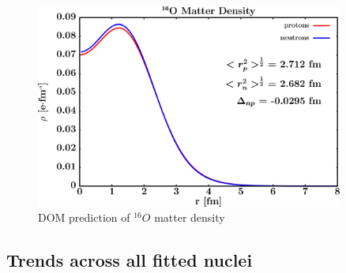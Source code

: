 \begin{figure}
\begin{center}
\includegraphics[width = 0.9\textwidth]{figures/o16_matterDensity.png}
\caption{DOM prediction of $^{16}O$ matter density}
\label{o16MatterDensity}
\end{center}
\end{figure}


\subsection{Trends across all fitted nuclei}

\afterpage{\clearpage}
